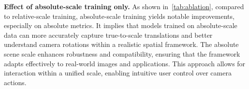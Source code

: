 \noindent\textbf{Effect of absolute-scale training only.}
As shown in~\cref{tab:ablation}, compared to relative-scale training, absolute-scale training yields notable improvements, especially on absolute metrics. 
It implies that models trained on absolute-scale data can more accurately capture true-to-scale translations and better understand camera rotations within a realistic spatial framework.
The absolute scene scale enhances robustness and compatibility, ensuring that the framework adapts effectively to real-world images and applications.
This approach allows for interaction within a unified scale, enabling intuitive user control over camera actions. 





